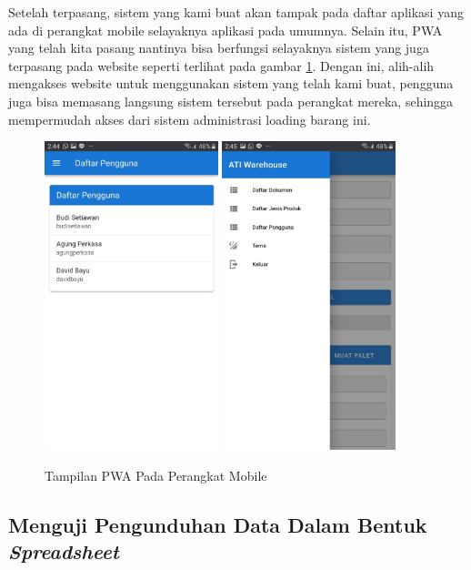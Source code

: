 Setelah terpasang, sistem yang kami buat akan tampak pada daftar aplikasi yang ada di perangkat mobile selayaknya aplikasi pada umumnya.
Selain itu, PWA yang telah kita pasang nantinya bisa berfungsi selayaknya sistem yang juga terpasang pada website seperti terlihat pada gambar \ref{fig:tampilanPwa}.
Dengan ini, alih-alih mengakses website untuk menggunakan sistem yang telah kami buat,  pengguna juga bisa memasang langsung sistem tersebut pada perangkat mereka, sehingga mempermudah akses dari sistem administrasi loading barang ini.

\begin{figure} [ht!] \centering
  \includegraphics[width=0.45\textwidth]{gambar/tampilan-pwa-1.jpg}
  \includegraphics[width=0.45\textwidth]{gambar/tampilan-pwa-2.jpg}
  \caption{Tampilan PWA Pada Perangkat Mobile}
	\label{fig:tampilanPwa}
\end{figure}

\subsection{Menguji Pengunduhan Data Dalam Bentuk \emph{Spreadsheet}}
\vspace{1ex}

\lipsum[4]
\vspace{0.5ex}